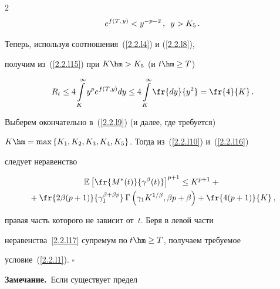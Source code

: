 \begin{multicols}{2}
\begin{equation}
\label{2.2.l8} 


e^{f(T,\,y)}<y^{-p-2}\,,\enskip y>K_5\,.


\end{equation}


Теперь, используя соотношения~(\ref{2.2.l4}) и (\ref{2.2.l8}),


получим из~(\ref{2.2.l15})  при  $K\hm>K_5$ (и $t \hm\geq T$)


\begin{equation}


R_t  \leq 4 \int\limits_{K}^\infty y^p e^{f(T,y)}dy \leq 


4 \int\limits_{K}^\infty \fr{dy}{y^2}=\fr{4}{K}\,.


\label{2.2.l16}


\end{equation}


Выберем окончательно в~(\ref{2.2.l9}) (и далее, где требуется)


$K\hm=\max \left\{K_1,K_2,K_3,K_4,K_5\right\}$. Тогда из~(\ref{2.2.l10}) и~(\ref{2.2.l16}) 


следует неравенство


\begin{multline}


\mathbb{E} \left[ \fr{M^*(t)}{\gamma^\beta(t)}\right]^{p+1} \leq 


K^{p+1} + {}\\


{}+\fr{2\beta(p+1)}{\gamma_1^{\beta+\beta p}}\, \Gamma\left(


\gamma_1 K^{1/\beta},\beta p+\beta \right) + \fr{4(p+1)}{K}\,, 


\label{2.2.l17}


\end{multline}


 правая часть которого не зависит от~$t$. Беря  в левой части


неравенства~\eqref{2.2.l17}  супремум по  $t \hm\geq T$, получаем требуемое 


условие~(\ref{2.2.l1}). \hfill$\square$








\smallskip





\noindent


\textbf{Замечание.}\ Если существует предел


\begin{equation}



\end{equation}
\end{multicols}
